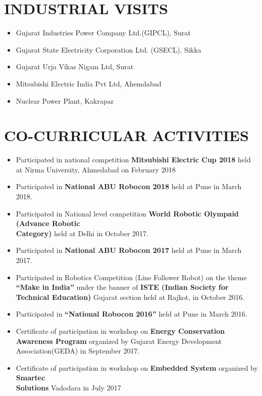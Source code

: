 \documentclass{res}
\begin{document}
\begin{resume}
 
\section{INDUSTRIAL VISITS}  
\begin{itemize} \itemsep -2pt  %
\item  Gujarat Industries Power Company Ltd.(GIPCL), Surat
\item Gujarat State Electricity Corporation Ltd. (GSECL), Sikka
\item Gujarat Urja Vikas Nigam Ltd, Surat
\item Mitsubishi Electric India Pvt Ltd, Ahemdabad
\item Nuclear  Power  Plant, Kakrapar   
\end{itemize}

\section{CO-CURRICULAR ACTIVITIES}  
\begin{itemize} \itemsep -2pt  %
\item Participated in national competition \textbf {Mitsubishi Electric Cup 2018} held at Nirma University, Ahmedabad on February 2018 
\item Participated in \textbf {National ABU Robocon 2018} held at Pune in March 2018.
\item Participated  in National level competition \textbf {World Robotic Olympaid (Advance Robotic \\Category)} held at Delhi in October 2017.
\item Participated in \textbf {National ABU Robocon 2017} held at Pune in March 2017.
\item  Participated in Robotics Competition (Line Follower Robot) on the theme \textbf {“Make in India”} under the banner of \textbf {ISTE (Indian Society for Technical Education)} Gujarat section held at Rajkot, in October 2016.   
\item  Participated in \textbf {“National Robocon 2016”} held at Pune in March 2016.
\item Certificate of participation in workshop on \textbf {Energy Conservation Awareness Program} organized by Gujarat Energy Development Association(GEDA) in September 2017.
\item Certificate of participation in workshop on \textbf {Embedded System} organized by \textbf {Smartec\\ Solutions} Vadodara in July 2017 

\end{itemize}
\end{resume}
\end{document}

